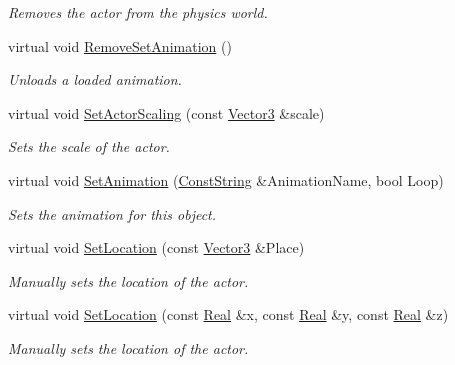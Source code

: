 \begin{DoxyCompactItemize}
\begin{DoxyCompactList}\small\item\em Removes the actor from the physics world. \item\end{DoxyCompactList}\item 
virtual void \hyperlink{classMezzanine_1_1ActorBase_a148df02e486650cba1aa384faf85975f}{RemoveSetAnimation} ()
\begin{DoxyCompactList}\small\item\em Unloads a loaded animation. \item\end{DoxyCompactList}\item 
virtual void \hyperlink{classMezzanine_1_1ActorBase_a59af6b6866b22038a0f63e398b33a834}{SetActorScaling} (const \hyperlink{classMezzanine_1_1Vector3}{Vector3} \&scale)
\begin{DoxyCompactList}\small\item\em Sets the scale of the actor. \item\end{DoxyCompactList}\item 
virtual void \hyperlink{classMezzanine_1_1ActorBase_af81c2b16a0a73608d9af4f9fb7e82ef4}{SetAnimation} (\hyperlink{namespaceMezzanine_a63cd699ac54b73953f35ec9cfc05e506}{ConstString} \&AnimationName, bool Loop)
\begin{DoxyCompactList}\small\item\em Sets the animation for this object. \item\end{DoxyCompactList}\item 
virtual void \hyperlink{classMezzanine_1_1ActorBase_a293c93bc4e1b22f64804fdce61312a67}{SetLocation} (const \hyperlink{classMezzanine_1_1Vector3}{Vector3} \&Place)
\begin{DoxyCompactList}\small\item\em Manually sets the location of the actor. \item\end{DoxyCompactList}\item 
virtual void \hyperlink{classMezzanine_1_1ActorBase_aa0f4211e037013524088c38c04ab2d80}{SetLocation} (const \hyperlink{namespaceMezzanine_a726731b1a7df72bf3583e4a97282c6f6}{Real} \&x, const \hyperlink{namespaceMezzanine_a726731b1a7df72bf3583e4a97282c6f6}{Real} \&y, const \hyperlink{namespaceMezzanine_a726731b1a7df72bf3583e4a97282c6f6}{Real} \&z)
\begin{DoxyCompactList}\small\item\em Manually sets the location of the actor. \item\end{DoxyCompactList}\item 

\end{DoxyCompactItemize}
